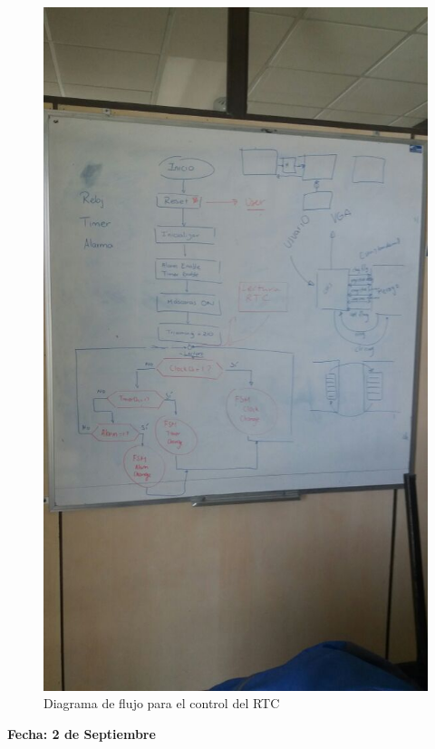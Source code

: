 \documentclass[12pt,a4paper]{report}
\begin{document}
\begin{figure}[hbtp]
	\centering
	\includegraphics[width=14cm]{Img/rtcdiagramaflujo.jpeg}
	\caption{Diagrama de flujo para el control del RTC}
	\label{fig:RTCdiagramaflujo}
\end{figure}

\newpage

\begin{flushright}
	\begin{large}
		\textbf{Fecha: 2 de Septiembre}\\[5ex]
	\end{large}
\end{flushright}
\end{document}
